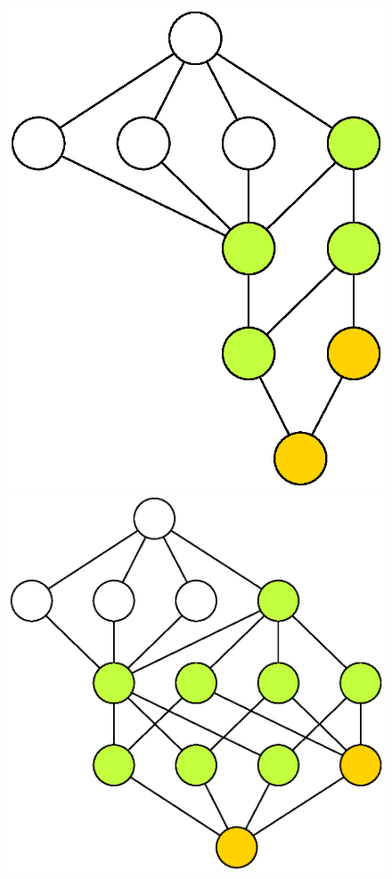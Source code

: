 \documentclass{mcom-l}
\begin{document}
\begin{figure}[H]

\centering
\includegraphics[scale=0.5]{Thesis/images/Coloured36_10LatticeGraph.eps}\hfill
\hfill\includegraphics[scale=0.5]{Thesis/images/Coloured36_42LatticeGraph.eps}\hfill

\caption{}


\end{figure}
\end{document}
